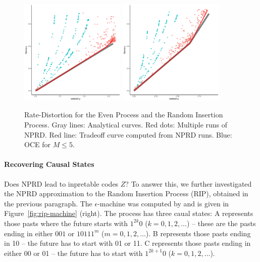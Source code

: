 \documentclass[11pt,letterpaper]{article}
\begin{document}
\begin{figure}
\includegraphics[width=0.45\textwidth]{code/figures/even-info.pdf}
\includegraphics[width=0.45\textwidth]{code/figures/rip-info.pdf}

	\caption{Rate-Distortion for the Even Process and the Random Insertion Process. Gray lines: Analytical curves. Red dots: Multiple runs of NPRD. Red line: Tradeoff curve computed from NPRD runs. Blue: OCE for $M\leq 5$. }\label{fig:even}
\end{figure}

\paragraph{Recovering Causal States}
Does NPRD lead to inpretable codes $Z$?
To answer this, we further investigated the NPRD approximation to the Random Insertion Process (RIP), obtained in the previous paragraph.
The $\epsilon$-machine was computed by  \cite{marzen-predictive-2016} and is given in Figure~\ref{fig:rip-machine} (right).
The process has three caual states:
A represents those pasts where the future starts with $1^{2k}0$ ($k = 0, 1, 2, \dots$) -- these are the pasts ending in either $001$ or $10111^m$ ($m= 0, 1, 2, \dots$). %
B represents those pasts ending in 10 -- the future has to start with 01 or 11.
C represents those pasts ending in either 00 or 01 -- the future has to start with $1^{2k+1}0$ ($k = 0, 1, 2, \dots$).
\end{document}
